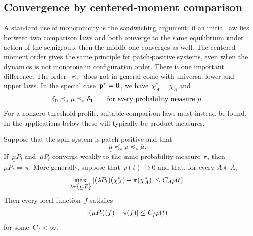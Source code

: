 \subsection{Convergence by centered-moment comparison}
\label{subsec:centered-moment-convergence}

A standard use of monotonicity is the sandwiching argument: if an initial law
lies between two comparison laws and both converge  to the
same equilibrium under action of the semigroup, then the middle one converges as well. The
centered-moment order gives the same principle for patch-positive systems, even
when the dynamics is not monotone in configuration order. There is one
important difference. The order~$\preceq_*$ does not in general come with
universal lower and upper laws. In the special case~$\mathbf{p}^\star=\mathbf{0}$, we
have~$\chi_A^*=\chi_A$ and
\begin{equation*}
\delta_{\mathbf{0}}\preceq_*\mu\preceq_*\delta_{\mathbf{1}}
\qquad\text{for every probability measure }\mu.
\end{equation*}
For a nonzero threshold profile, suitable comparison laws must instead be
found. In the applications below these will typically be product measures.

\begin{corollary}
\label{cor:centered-moment-convergence}
Suppose that the spin system is patch-positive and that
\begin{equation*}
\underline\mu\preceq_*\mu\preceq_*\overline\mu.
\end{equation*}
If~$\underline\mu P_t$ and~$\overline\mu P_t$ converge weakly to the same
probability measure~$\pi$, then~$\mu P_t\Rightarrow\pi$. 
More generally, suppose that~$\rho(t)\to0$ and that, for every
$A\Subset\Lambda$,
\begin{equation*}
\max_{\lambda\in\left\{\underline\mu,\overline\mu\right\}}
\left|(\lambda P_t)(\chi_A^*)-\pi(\chi_A^*)\right|
\leq
C_A\rho(t).
\end{equation*}
Then every local function~$f$ satisfies
\begin{equation*}
\left|(\mu P_t)(f)-\pi(f)\right|
\leq
C_f\rho(t)
\end{equation*}
for some~$C_f<\infty$.
\end{corollary}

